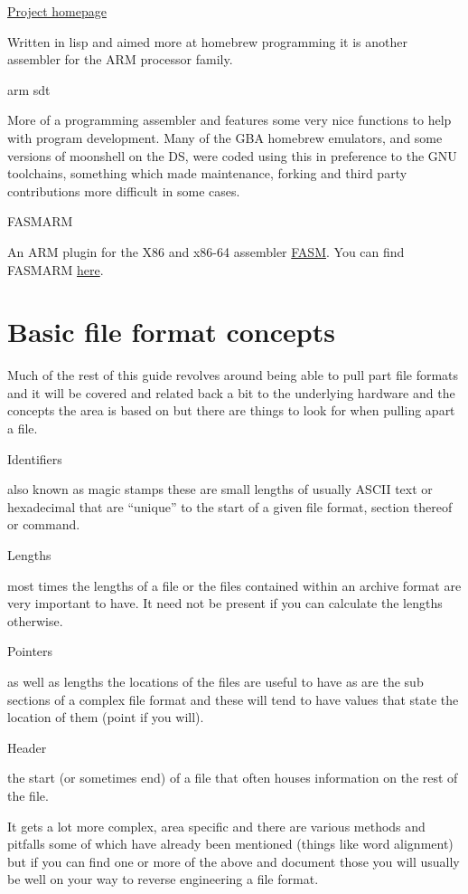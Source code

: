 \documentclass[
]{book}
\begin{document}
\href{http://common-lisp.net/project/armish/}{Project homepage}

Written in lisp and aimed more at homebrew programming it is another assembler for the ARM processor family.

arm sdt

More of a programming assembler and features some very nice functions to help with program development. Many of the GBA homebrew emulators, and some versions of moonshell on the DS, were coded using this in preference to the GNU toolchains, something which made maintenance, forking and third party contributions more difficult in some cases.

FASMARM

An ARM plugin for the X86 and x86-64 assembler \href{http://flatassembler.net/}{FASM}. You can find FASMARM \href{http://arm.flatassembler.net/}{here}.

\hypertarget{basic-file-format-concepts}{%
\section{Basic file format concepts}\label{basic-file-format-concepts}}

Much of the rest of this guide revolves around being able to pull part file formats and it will be covered and related back a bit to the underlying hardware and the concepts the area is based on but there are things to look for when pulling apart a file.

Identifiers

also known as magic stamps these are small lengths of usually ASCII text or hexadecimal that are ``unique'' to the start of a given file format, section thereof or command.

Lengths

most times the lengths of a file or the files contained within an archive format are very important to have. It need not be present if you can calculate the lengths otherwise.

Pointers

as well as lengths the locations of the files are useful to have as are the sub sections of a complex file format and these will tend to have values that state the location of them (point if you will).

Header

the start (or sometimes end) of a file that often houses information on the rest of the file.

It gets a lot more complex, area specific and there are various methods and pitfalls some of which have already been mentioned (things like word alignment) but if you can find one or more of the above and document those you will usually be well on your way to reverse engineering a file format.
\end{document}
